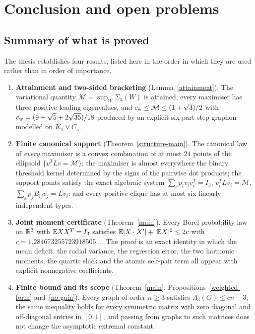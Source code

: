\chapter{Conclusion and open problems}\label{ch-conclusion}\label{sec-further}

\section{Summary of what is proved}
The thesis establishes four results, listed here in the order in which they
are used rather than in order of importance.

\begin{enumerate}[leftmargin=2.2em,itemsep=4pt]
\item \textbf{Attainment and two-sided bracketing}
(Lemma~\ref{attainment}). The variational quantity $\mathcal M=\sup_W
\Sigma_3(W)$ is attained, every maximiser has three positive leading
eigenvalues, and $c_{\mathrm{w}}\le\mathcal M\le(1+\sqrt3)/2$ with
$c_{\mathrm{w}}=(9+\sqrt5+2\sqrt{35})/18$ produced by an explicit six-part step
graphon modelled on $K_1\vee C_5$.

\item \textbf{Finite canonical support} (Theorem~\ref{structure-main}). The
canonical law of \emph{every} maximiser is a convex combination of at most
$24$ points of the ellipsoid $\{v^TLv=\mathcal M\}$; the maximiser is almost
everywhere the binary threshold kernel determined by the signs of the pairwise
dot products; the support points satisfy the exact algebraic system
$\sum_ip_iv_iv_i^T=I_3$, $v_i^TLv_i=\mathcal M$, $\sum_jp_jB_{ij}v_j=Lv_i$;
and every positive clique has at most six linearly independent types.

\item \textbf{Joint moment certificate} (Theorem~\ref{main}). Every Borel
probability law on $\mathbb R^3$ with $\mathbb E XX^T=I_3$ satisfies
$\mathbb E|X\cdot X'|+|\mathbb E X|^2\le2c$ with
$c=1.284673255723918505\ldots$. The proof is an exact identity in which the
mean deficit, the radial variance, the regression error, the two harmonic
moments, the quartic slack and the atomic self-pair term all appear with
explicit nonnegative coefficients.

\item \textbf{Finite bound and its scope} (Theorem~\ref{main},
Propositions~\ref{weighted-form} and~\ref{no-gain}). Every graph of order
$n\ge3$ satisfies $\Lambda_3(G)\le cn-3$; the same inequality holds for every
symmetric matrix with zero diagonal and off-diagonal entries in $[0,1]$; and
passing from graphs to such matrices does not change the asymptotic extremal
constant.
\end{enumerate}

